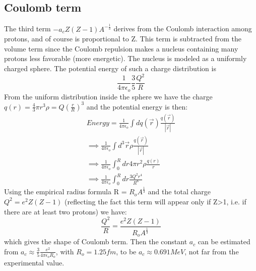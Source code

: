 \documentclass[11pt, a4paper]{article}
\begin{document}
\subsection*{Coulomb term}
The third term $-a_c Z(Z-1)A^{-\frac{1}{3}}$ derives from the Coulomb interaction among protons, and of course is proportional to Z. This term is subtracted from the volume term since the Coulomb repulsion makes a nucleus containing many protons less favorable (more energetic).
The nucleus is modeled as a uniformly charged sphere. The potential energy of such a charge distribution is
\begin{equation}
    \frac{1}{4\pi \epsilon_{o} }\frac{3}{5}\frac{Q^2}{R}
\end{equation}
From the uniform distribution inside the sphere we have the charge \(q(r)=\frac{4}{3}\pi r^3 \rho = Q (\frac{r}{R})^3\) and the potential energy is then:
\begin{gather}
    Energy = \frac{1}{4 \pi \epsilon_{o} } \int dq(\vec{r}) \frac{q(\vec{r})}{\left\vert \vec{r} \right\vert } \\\implies  \frac{1}{4 \pi \epsilon_{o} }\int d^{3}\vec{r} \rho \frac{q(\vec{r})}{\left\vert \vec{r} \right\vert } \\ \implies  \frac{1}{4 \pi \epsilon_{o}} \int_0 ^R dr 4 \pi r^2 \rho \frac{q(r)}{r} \\
   \implies  \frac{1}{4 \pi \epsilon_{o} } \int _0 ^R dr \frac{3 Q^2 r^4}{R^6}
\end{gather} 
Using the empirical radius formula R = $R_o A^{\frac{1}{3}}$ and the total charge \(Q^2 = e^2 Z(Z-1)\) (reflecting the fact this term will appear only if Z>1, i.e. if there are at least two protons) we have:
\begin{equation}
    \frac{Q^2}{R} = \frac{e^2 Z(Z-1)}{R_o A^{\frac{1}{3}}}
\end{equation}
which gives the shape of Coulomb term. Then the constant $a_c$ can be estimated from $a_c \approx \frac{3}{5}\frac{e^2}{4 \pi \epsilon_{o} R_o}$, with $R_o = 1.25fm$, to be $a_c \approx 0.691 MeV$, not far from the experimental value. 
\end{document}
